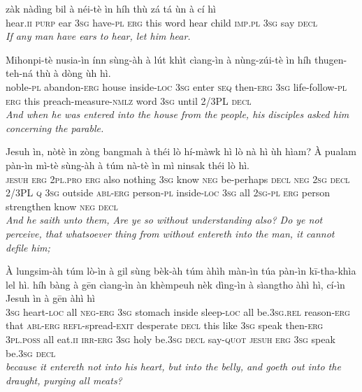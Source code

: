 \documentclass[11pt,a4paper]{article}
\begin{document}
\begin{exe}
\gll zàk nàdìng bil à néi-tè ìn híh thù zá tá ùn à cí hì \\
     hear.\textsc{ii} \textsc{purp} ear \textsc{3sg} have-\textsc{pl} \textsc{erg} this word hear child \textsc{imp}.\textsc{pl} \textsc{3sg} say \textsc{decl} \\
\glt \textcolor{kjvcolor}{\textit{If any man have ears to hear, let him hear.}}

\gll Mihonpi-tè nusia-ìn ínn sùng-àh à lút khìt cìang-ìn à nùng-zúi-tè ìn híh thugen-teh-ná thù à dòng ùh hì. \\
     noble-\textsc{pl} abandon-\textsc{erg} house inside-\textsc{loc} \textsc{3sg} enter \textsc{seq} then-\textsc{erg} \textsc{3sg} life-follow-\textsc{pl} \textsc{erg} this preach-measure-\textsc{nmlz} word \textsc{3sg} until 2/3PL \textsc{decl} \\
\glt \textcolor{kjvcolor}{\textit{And when he was entered into the house from the people, his disciples asked him concerning the parable.}}

\gll Jesuh ìn, nòtè ìn zòng bangmah à théi lò hí-màwk hì lò nà hì ùh hìam? À pualam pàn-ìn mì-tè sùng-àh à túm nà-tè ìn mì ninsak théi lò hì. \\
     \textsc{jesuh} \textsc{erg} \textsc{2pl}.\textsc{pro} \textsc{erg} also nothing \textsc{3sg} know \textsc{neg} be-perhaps \textsc{decl} \textsc{neg} \textsc{2sg} \textsc{decl} 2/3PL \textsc{q} \textsc{3sg} outside \textsc{abl}-\textsc{erg} person-\textsc{pl} inside-\textsc{loc} \textsc{3sg} all \textsc{2sg}-\textsc{pl} \textsc{erg} person strengthen know \textsc{neg} \textsc{decl} \\
\glt \textcolor{kjvcolor}{\textit{And he saith unto them, Are ye so without understanding also? Do ye not perceive, that whatsoever thing from without entereth into the man, it cannot defile him;}}

\gll À lungsim-àh túm lò-ìn à gil sùng bèk-àh túm àhìh màn-ìn túa pàn-ìn kī-tha-khìa lel hì. híh bàng à gēn cìang-ìn àn khèmpeuh nèk dìng-ìn à sìangtho àhì hì, cí-ìn Jesuh ìn à gēn àhì hì \\
     \textsc{3sg} heart-\textsc{loc} all \textsc{neg}-\textsc{erg} \textsc{3sg} stomach inside sleep-\textsc{loc} all be.\textsc{3sg}.\textsc{rel} reason-\textsc{erg} that \textsc{abl}-\textsc{erg} \textsc{refl}-spread-\textsc{exit} desperate \textsc{decl} this like \textsc{3sg} speak then-\textsc{erg} \textsc{3pl}.\textsc{poss} all eat.\textsc{ii} \textsc{irr}-\textsc{erg} \textsc{3sg} holy be.\textsc{3sg} \textsc{decl} say-\textsc{quot} \textsc{jesuh} \textsc{erg} \textsc{3sg} speak be.\textsc{3sg} \textsc{decl} \\
\glt \textcolor{kjvcolor}{\textit{because it entereth not into his heart, but into the belly, and goeth out into the draught, purging all meats?}}


\end{exe}
\end{document}
